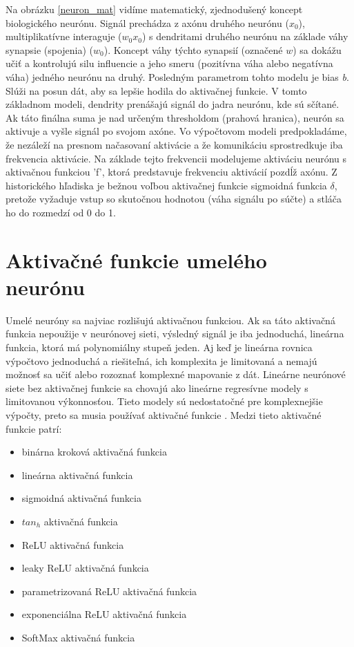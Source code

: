 Na obrázku \ref{neuron_mat} vidíme matematický, zjednodušený koncept biologického neurónu. Signál prechádza z axónu druhého neurónu ($x_0$), multiplikatívne interaguje ($w_0x_0$) s dendritami druhého neurónu na základe váhy synapsie (spojenia) ($w_0$). Koncept váhy týchto synapsií (označené $w$) sa dokážu učiť a kontrolujú silu influencie a jeho smeru (pozitívna váha alebo negatívna váha) jedného neurónu na druhý. Posledným parametrom tohto modelu je bias \emph{b}. Slúži na posun dát, aby sa lepšie hodila do  aktivačnej funkcie. V tomto základnom modeli, dendrity prenášajú signál do jadra neurónu, kde sú sčítané. Ak táto finálna suma je nad určeným thresholdom (prahová hranica), neurón sa aktivuje a vyšle signál po svojom axóne. Vo výpočtovom modeli predpokladáme, že nezáleží na presnom načasovaní aktivácie a že komunikáciu sprostredkuje iba frekvencia aktivácie. Na základe tejto frekvencii modelujeme aktiváciu neurónu s aktivačnou funkciou 'f', ktorá predstavuje frekvenciu aktivácií pozdĺž axónu. Z historického hľadiska je bežnou voľbou aktivačnej funkcie sigmoidná funkcia $\delta$, pretože vyžaduje vstup so skutočnou hodnotou (váha signálu po súčte) a stláča ho do rozmedzí od 0 do 1.\cite{stanford}

\section{Aktivačné funkcie umelého neurónu}
Umelé neuróny sa najviac rozlišujú aktivačnou funkciou. Ak sa táto aktivačná funkcia nepoužije v neurónovej sieti, výsledný signál je iba jednoduchá, lineárna funkcia, ktorá má polynomiálny stupeň jeden. Aj keď je lineárna rovnica  výpočtovo jednoduchá a riešiteľná, ich komplexita je limitovaná a nemajú možnosť sa učiť alebo rozoznať komplexné mapovanie z dát. Lineárne neurónové siete bez aktivačnej funkcie sa chovajú ako lineárne regresívne modely s limitovanou výkonnosťou. Tieto modely sú nedostatočné pre komplexnejšie výpočty, preto sa musia používať aktivačné funkcie . Medzi tieto aktivačné funkcie patrí:
\begin{itemize}
    \item binárna kroková aktivačná funkcia
    \item lineárna aktivačná funkcia
    \item sigmoidná aktivačná funkcia
    \item $tan_h$ aktivačná funkcia
    \item ReLU aktivačná funkcia
    \item leaky ReLU aktivačná funkcia
    \item parametrizovaná ReLU  aktivačná funkcia
    \item exponenciálna ReLU aktivačná funkcia
    \item SoftMax aktivačná funkcia
\end{itemize}
\cite{sharma}

